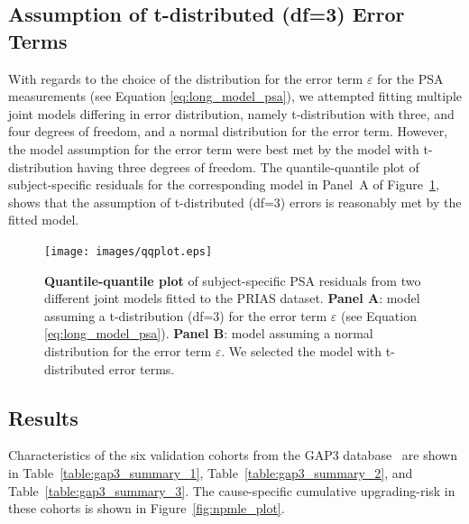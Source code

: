 \subsection{Assumption of t-distributed (df=3) Error Terms}
\label{subsec:t-dist-assumption}
With regards to the choice of the distribution for the error term $\varepsilon$ for the PSA measurements (see Equation \ref{eq:long_model_psa}), we attempted fitting multiple joint models differing in error distribution, namely t-distribution with three, and four degrees of freedom, and a normal distribution for the error term. However, the model assumption for the error term were best met by the model with t-distribution having three degrees of freedom. The quantile-quantile plot of subject-specific residuals for the corresponding model in Panel~A of Figure~\ref{fig:qqplot}, shows that the assumption of t-distributed (df=3) errors is reasonably met by the fitted model. 

\begin{figure}
\centerline{\texttt{[image: images/qqplot.eps]}}
\caption{\textbf{Quantile-quantile plot} of subject-specific PSA residuals from two different joint models fitted to the PRIAS dataset. \textbf{Panel A}: model assuming a t-distribution (df=3) for the error term $\varepsilon$ (see Equation \ref{eq:long_model_psa}). \textbf{Panel B}: model assuming a normal distribution for the error term $\varepsilon$. We selected the model with t-distributed error terms.}
\label{fig:qqplot}
\end{figure}

\clearpage
\subsection{Results}
Characteristics of the six validation cohorts from the GAP3 database~\citep{gap3_2018} are shown in Table~\ref{table:gap3_summary_1}, Table~\ref{table:gap3_summary_2}, and Table~\ref{table:gap3_summary_3}. The cause-specific cumulative upgrading-risk in these cohorts is shown in Figure~\ref{fig:npmle_plot}.

